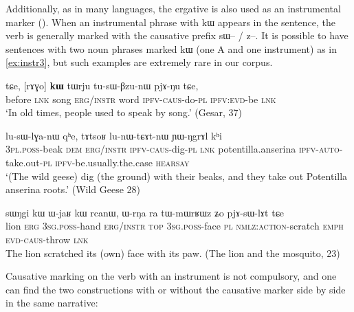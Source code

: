 \documentclass[oldfontcommands,oneside,a4paper,11pt]{article}
\newcommand{\ipa}[1]{{\phon #1}} %
\begin{document}
Additionally, as in many languages, the ergative is also used as an instrumental marker (\citealt[32]{agent02palancar}). When an  instrumental phrase with 	\ipa{kɯ}  appears in the sentence, the verb is generally marked with the causative prefix \ipa{sɯ}-- / \ipa{z}--. It is possible  to have sentences with two noun phrases marked \ipa{kɯ} (one A and one instrument) as in \ref{ex:instr3}, but such examples are extremely rare in our corpus.

 \begin{exe}
\ex \label{ex:instr}
\gll \ipa{kɯɕɯŋgɯ}   	\ipa{tɕe,}   	[\ipa{rɤɣo}]   	\ipa{\textbf{kɯ}}   	\ipa{tɯrju}   	\ipa{tu-sɯ-βzu-nɯ}   	\ipa{pjɤ-ŋu}   	\ipa{tɕe,}     \\
before \textsc{lnk} song \textsc{erg/instr} word \textsc{ipfv}-\textsc{caus}-do-\textsc{pl} \textsc{ipfv:evd}-be \textsc{lnk}\\
\glt  `In old times, people used to speak by song.' (Gesar, 37)
\end{exe}
 \begin{exe}
\ex \label{ex:instr2}
\gll [\ipa{nɯ-mtsioʁ}   	\ipa{nɯ}]   	\ipa{\textbf{kɯ}}   	\ipa{lu-sɯ-lɣa-nɯ}   	\ipa{qʰe,}   	\ipa{tɤtsoʁ}   	\ipa{lu-nɯ-tɕɤt-nɯ}   	\ipa{ɲɯ-ŋgrɤl}   	\ipa{kʰi}        \\
\textsc{3pl.poss}-beak \textsc{dem} \textsc{erg/instr} \textsc{ipfv-caus}-dig-\textsc{pl} \textsc{lnk} potentilla.anserina \textsc{ipfv-auto}-take.out-\textsc{pl} \textsc{ipfv}-be.usually.the.case \textsc{hearsay} \\
\glt  `(The wild geese) dig (the ground) with their beaks, and they take out Potentilla anserina roots.' (Wild Geese 28)
\end{exe}

\begin{exe}
\ex \label{ex:instr3}
\gll
 \ipa{sɯŋgi} 	\ipa{kɯ} 	\ipa{ɯ-jaʁ} 	\ipa{kɯ} 	\ipa{rcanɯ,} 	\ipa{ɯ-rŋa} 	\ipa{ra} 	\ipa{tɯ-mɯrʁɯz} 	\ipa{ʑo} 	\ipa{pjɤ-sɯ-lɤt} 	\ipa{tɕe} \\
 lion \textsc{erg} \textsc{3sg.poss}-hand \textsc{erg/instr} \textsc{top} \textsc{3sg.poss}-face \textsc{pl} \textsc{nmlz:action}-scratch \textsc{emph} \textsc{evd-caus}-throw \textsc{lnk}\\
\glt The lion scratched its (own) face with its paw. (The lion and the mosquito, 23)
\end{exe}
Causative marking on the verb with an instrument is not compulsory, and one can find the two constructions with or without the causative marker side by side in the same narrative:
\end{document}
